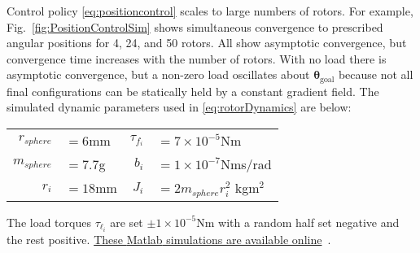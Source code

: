  Control policy  \eqref{eq:positioncontrol} scales to large numbers of rotors.  For example, Fig.~\ref{fig:PositionControlSim} shows simultaneous convergence to prescribed angular positions for 4, 24, and 50 rotors. All show asymptotic convergence, but convergence time increases with the number of rotors. With no load there is asymptotic convergence, but a non-zero load oscillates about $\bm{\theta}_{\textrm{goal}}$ because not all final configurations can be statically held by a constant gradient field.
 The simulated dynamic parameters used  in \eqref{eq:rotorDynamics} are below:
\setlength{\tabcolsep}{1pt}      
\begin{center}
\begin{tabular}{  r l  @{\hskip .5in}  r l }      
$r_{sphere}$&$= 6$mm 				&  $\tau_{f_i}$&$=  7\times 10^{-5}$Nm  \\
$m_{sphere}$&$= 7.7$g  				&  $b_i $&$=  1\times 10^{-7}$Nms/rad \\
 $r_i  $&$= 18$mm					&   $J_i $&$= 2m_{sphere}  r_i^2$ kgm$^2$\\
\end{tabular}
\end{center}
The load torques $\tau_{\ell_i}$ are set $\pm1\times 10^{-5}$Nm with a random half set negative and the rest positive.  \href{http://www.mathworks.com/matlabcentral/fileexchange/45331}{These {\sc Matlab} simulations are available online}~\cite{Becker2014b}.

